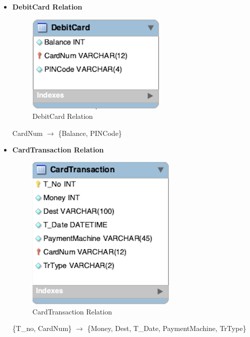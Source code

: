 \documentclass[12pt,a4paper]{article}
\begin{document}
\begin{itemize}
     \item \textbf{DebitCard Relation}
        \begin{figure}[H]
            \centering
            \includegraphics[]{Picture/DebitCardRelation.png}
            \caption{DebitCard Relation}
        \end{figure}
     CardNum $\longrightarrow$ \{Balance, PINCode\}\\
     
     \item \textbf{CardTransaction Relation}
        \begin{figure}[H]
            \centering
            \includegraphics[]{Picture/CardTransactionRelation.png}
            \caption{CardTransaction Relation}
        \end{figure}
     \{T\_no, CardNum\} $\longrightarrow$ \{Money, Dest, T\_Date, PaymentMachine, TrType\}\\
     

\end{itemize}
\end{document}

